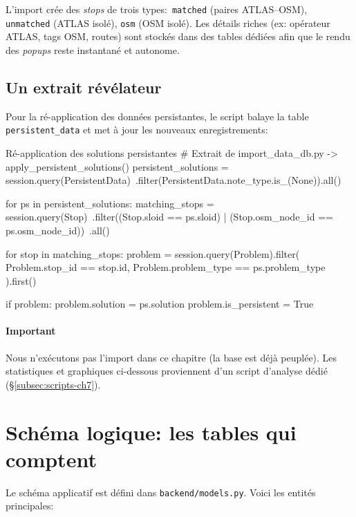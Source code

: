 L'import crée des \textit{stops} de trois types:\ \texttt{matched} (paires ATLAS–OSM), \texttt{unmatched} (ATLAS isolé), \texttt{osm} (OSM isolé). Les détails riches (ex: opérateur ATLAS, tags OSM, routes) sont stockés dans des tables dédiées afin que le rendu des \emph{popups} reste instantané et autonome.

\subsection*{Un extrait révélateur}
Pour la ré-application des données persistantes, le script balaye la table \texttt{persistent\_data} et met à jour les nouveaux enregistrements:

\begin{codebox}[language=Python]{Ré-application des solutions persistantes}
# Extrait de import_data_db.py -> apply_persistent_solutions()
persistent_solutions = session.query(PersistentData)\
    .filter(PersistentData.note_type.is_(None)).all()

for ps in persistent_solutions:
    matching_stops = session.query(Stop)\
        .filter((Stop.sloid == ps.sloid) | (Stop.osm_node_id == ps.osm_node_id))\
        .all()
    
    for stop in matching_stops:
        problem = session.query(Problem).filter(
            Problem.stop_id == stop.id,
            Problem.problem_type == ps.problem_type
        ).first()
        
        if problem:
            problem.solution = ps.solution
            problem.is_persistent = True
\end{codebox}

\paragraph{Important} Nous n'exécutons pas l'import dans ce chapitre (la base est déjà peuplée). Les statistiques et graphiques ci-dessous proviennent d'un script d'analyse dédié (\S\ref{subsec:scripts-ch7}).

\section{Schéma logique: les tables qui comptent}

Le schéma applicatif est défini dans \texttt{backend/models.py}. Voici les entités principales:

